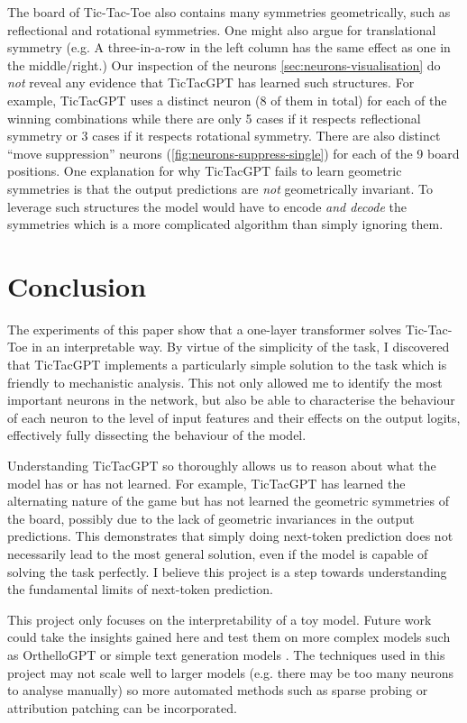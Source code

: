 \documentclass{article}
\newcommand{\ttgpt}{TicTacGPT\xspace}
\newcommand{\ttt}{Tic-Tac-Toe\xspace}
\begin{document}
The board of \ttt also contains many symmetries geometrically, such as reflectional and rotational symmetries. One might also argue for translational symmetry (e.g. A three-in-a-row in the left column has the same effect as one in the middle/right.) Our inspection of the neurons \cref{sec:neurons-visualisation} do \emph{not} reveal any evidence that \ttgpt has learned such structures. For example, \ttgpt uses a distinct neuron (8 of them in total) for each of the winning combinations while there are only 5 cases if it respects reflectional symmetry or 3 cases if it respects rotational symmetry. There are also distinct ``move suppression'' neurons (\cref{fig:neurons-suppress-single}) for each of the 9 board positions. One explanation for why \ttgpt fails to learn geometric symmetries is that the output predictions are \emph{not} geometrically invariant. To leverage such structures the model would have to encode \emph{and decode} the symmetries which is a more complicated algorithm than simply ignoring them.

\section{Conclusion}

The experiments of this paper show that a one-layer transformer solves \ttt in an interpretable way. By virtue of the simplicity of the task, I discovered that \ttgpt implements a particularly simple solution to the task which is friendly to mechanistic analysis. This not only allowed me to identify the most important neurons in the network, but also be able to characterise the behaviour of each neuron to the level of input features and their effects on the output logits, effectively fully dissecting the behaviour of the model.

Understanding \ttgpt so thoroughly allows us to reason about what the model has or has not learned. For example, \ttgpt has learned the alternating nature of the game but has not learned the geometric symmetries of the board, possibly due to the lack of geometric invariances in the output predictions. This demonstrates that simply doing next-token prediction does not necessarily lead to the most general solution, even if the model is capable of solving the task perfectly. I believe this project is a step towards understanding the fundamental limits of next-token prediction.

This project only focuses on the interpretability of a toy model. Future work could take the insights gained here and test them on more complex models such as OrthelloGPT \cite{orthello-gpt} or simple text generation models \cite{olsson2022context}. The techniques used in this project may not scale well to larger models (e.g. there may be too many neurons to analyse manually) so more automated methods such as sparse probing \cite{gurnee2023finding} or attribution patching \cite{nanda2023attribution} can be incorporated.
\end{document}
